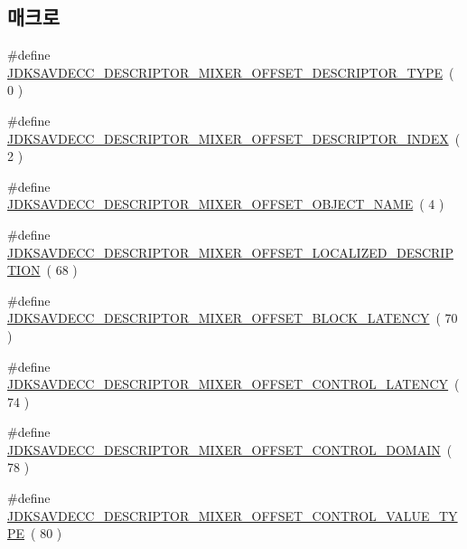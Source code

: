 \subsection*{매크로}
\begin{DoxyCompactItemize}
\item 
\#define \hyperlink{group__descriptor__mixer_ga72185bf62008b6194113adbe54b698cd}{J\+D\+K\+S\+A\+V\+D\+E\+C\+C\+\_\+\+D\+E\+S\+C\+R\+I\+P\+T\+O\+R\+\_\+\+M\+I\+X\+E\+R\+\_\+\+O\+F\+F\+S\+E\+T\+\_\+\+D\+E\+S\+C\+R\+I\+P\+T\+O\+R\+\_\+\+T\+Y\+PE}~( 0 )
\item 
\#define \hyperlink{group__descriptor__mixer_ga436123d3d9bba251d350da757c6f56cf}{J\+D\+K\+S\+A\+V\+D\+E\+C\+C\+\_\+\+D\+E\+S\+C\+R\+I\+P\+T\+O\+R\+\_\+\+M\+I\+X\+E\+R\+\_\+\+O\+F\+F\+S\+E\+T\+\_\+\+D\+E\+S\+C\+R\+I\+P\+T\+O\+R\+\_\+\+I\+N\+D\+EX}~( 2 )
\item 
\#define \hyperlink{group__descriptor__mixer_ga209978f1f3ade5c2822f3e4e104a39ba}{J\+D\+K\+S\+A\+V\+D\+E\+C\+C\+\_\+\+D\+E\+S\+C\+R\+I\+P\+T\+O\+R\+\_\+\+M\+I\+X\+E\+R\+\_\+\+O\+F\+F\+S\+E\+T\+\_\+\+O\+B\+J\+E\+C\+T\+\_\+\+N\+A\+ME}~( 4 )
\item 
\#define \hyperlink{group__descriptor__mixer_ga89dc2305d7045c0aab85cfc41bc621cd}{J\+D\+K\+S\+A\+V\+D\+E\+C\+C\+\_\+\+D\+E\+S\+C\+R\+I\+P\+T\+O\+R\+\_\+\+M\+I\+X\+E\+R\+\_\+\+O\+F\+F\+S\+E\+T\+\_\+\+L\+O\+C\+A\+L\+I\+Z\+E\+D\+\_\+\+D\+E\+S\+C\+R\+I\+P\+T\+I\+ON}~( 68 )
\item 
\#define \hyperlink{group__descriptor__mixer_ga1a3a8931227d98f8b37cbfe8aa5bbf4b}{J\+D\+K\+S\+A\+V\+D\+E\+C\+C\+\_\+\+D\+E\+S\+C\+R\+I\+P\+T\+O\+R\+\_\+\+M\+I\+X\+E\+R\+\_\+\+O\+F\+F\+S\+E\+T\+\_\+\+B\+L\+O\+C\+K\+\_\+\+L\+A\+T\+E\+N\+CY}~( 70 )
\item 
\#define \hyperlink{group__descriptor__mixer_ga83a64a412847aa1f42ea080e9e84d4ab}{J\+D\+K\+S\+A\+V\+D\+E\+C\+C\+\_\+\+D\+E\+S\+C\+R\+I\+P\+T\+O\+R\+\_\+\+M\+I\+X\+E\+R\+\_\+\+O\+F\+F\+S\+E\+T\+\_\+\+C\+O\+N\+T\+R\+O\+L\+\_\+\+L\+A\+T\+E\+N\+CY}~( 74 )
\item 
\#define \hyperlink{group__descriptor__mixer_gab0c4900f10973ad3bf6349cea6b6a62e}{J\+D\+K\+S\+A\+V\+D\+E\+C\+C\+\_\+\+D\+E\+S\+C\+R\+I\+P\+T\+O\+R\+\_\+\+M\+I\+X\+E\+R\+\_\+\+O\+F\+F\+S\+E\+T\+\_\+\+C\+O\+N\+T\+R\+O\+L\+\_\+\+D\+O\+M\+A\+IN}~( 78 )
\item 
\#define \hyperlink{group__descriptor__mixer_ga3d396bfa44355854b835ba88519b8149}{J\+D\+K\+S\+A\+V\+D\+E\+C\+C\+\_\+\+D\+E\+S\+C\+R\+I\+P\+T\+O\+R\+\_\+\+M\+I\+X\+E\+R\+\_\+\+O\+F\+F\+S\+E\+T\+\_\+\+C\+O\+N\+T\+R\+O\+L\+\_\+\+V\+A\+L\+U\+E\+\_\+\+T\+Y\+PE}~( 80 )

\end{DoxyCompactItemize}

